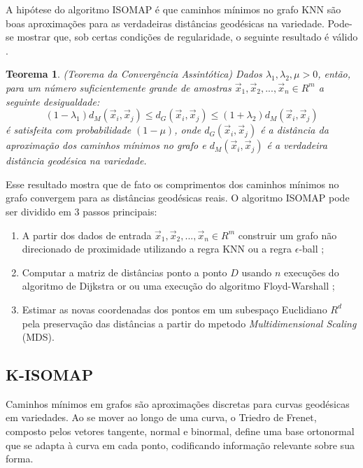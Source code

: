 \documentclass[a4paper,12pt]{article}
\newtheorem{theorem}{Teorema}
\begin{document}
A hipótese do algoritmo ISOMAP é que caminhos mínimos no grafo KNN são boas aproximações para as verdadeiras distâncias geodésicas na variedade. Pode-se mostrar que, sob certas condições de regularidade, o seguinte resultado é válido \cite{Isomap_converg}.

\begin{theorem}{(Teorema da Convergência Assintótica)}
	Dados $\lambda_1 , \lambda_2 , \mu > 0$, então, para um número suficientemente grande de amostras $\vec{x}_1, \vec{x}_2, ..., \vec{x}_n \in R^m$ a seguinte desigualdade:
	\begin{equation}
		(1 - \lambda_1) d_M(\vec{x}_i , \vec{x}_j) \leq d_G(\vec{x}_i , \vec{x}_j) \leq (1 + \lambda_2) d_M(\vec{x}_i , \vec{x}_j)
	\end{equation} é satisfeita com probabilidade $(1 - \mu)$, onde $d_G(\vec{x}_i , \vec{x}_j)$ é a distância da aproximação dos caminhos mínimos no grafo e $d_M(\vec{x}_i , \vec{x}_j)$ é a verdadeira distância geodésica na variedade.
\end{theorem}

Esse resultado mostra que de fato os comprimentos dos caminhos mínimos no grafo convergem para as distâncias geodésicas reais. O algoritmo ISOMAP pode ser dividido em 3 passos principais: 

\begin{enumerate}
	\item A partir dos dados de entrada $\vec{x}_1, \vec{x}_2, ..., \vec{x}_n \in R^m$ construir um grafo não direcionado de proximidade utilizando a regra KNN ou a regra $\epsilon$-ball \cite{Luxburg};
	\item Computar a matriz de distâncias ponto a ponto $D$ usando $n$ execuções do algoritmo de Dijkstra or ou uma execução do algoritmo Floyd-Warshall \cite{Cormen};
	\item Estimar as novas coordenadas dos pontos em um subespaço Euclidiano $R^d$ pela preservação das distâncias a partir do mpetodo \emph{Multidimensional Scaling} (MDS).
\end{enumerate}

\subsection{K-ISOMAP}
\noindent
Caminhos mínimos em grafos são aproximações discretas para curvas geodésicas em variedades. Ao se mover ao longo de uma curva, o Triedro de Frenet, composto pelos vetores tangente, normal e binormal, define uma base ortonormal que se adapta à curva em cada ponto, codificando informação relevante sobre sua forma.
\end{document}
